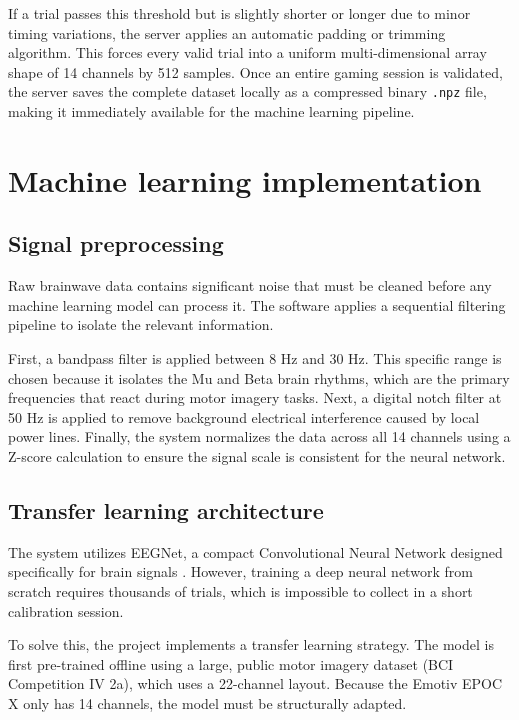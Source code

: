 \documentclass[a4paper, 11pt, openany]{report}
\let\cite\citep
\begin{document}
    If a trial passes this threshold but is slightly shorter or longer due to minor timing variations, the server applies an automatic padding or trimming algorithm. This forces every valid trial into a uniform multi-dimensional array shape of 14 channels by 512 samples. Once an entire gaming session is validated, the server saves the complete dataset locally as a compressed binary \texttt{.npz} file, making it immediately available for the machine learning pipeline.


    \section{Machine learning implementation}

    \subsection{Signal preprocessing}
    
    Raw brainwave data contains significant noise that must be cleaned before any machine learning model can process it. The software applies a sequential filtering pipeline to isolate the relevant information.

    First, a bandpass filter is applied between 8 Hz and 30 Hz. This specific range is chosen because it isolates the Mu and Beta brain rhythms, which are the primary frequencies that react during motor imagery tasks. Next, a digital notch filter at 50 Hz is applied to remove background electrical interference caused by local power lines. Finally, the system normalizes the data across all 14 channels using a Z-score calculation to ensure the signal scale is consistent for the neural network.

    \subsection{Transfer learning architecture}
    
    The system utilizes EEGNet, a compact Convolutional Neural Network designed specifically for brain signals \cite{lawhern2018eegnet}. However, training a deep neural network from scratch requires thousands of trials, which is impossible to collect in a short calibration session.

    To solve this, the project implements a transfer learning strategy. The model is first pre-trained offline using a large, public motor imagery dataset (BCI Competition IV 2a), which uses a 22-channel layout. Because the Emotiv EPOC X only has 14 channels, the model must be structurally adapted.
\end{document}
